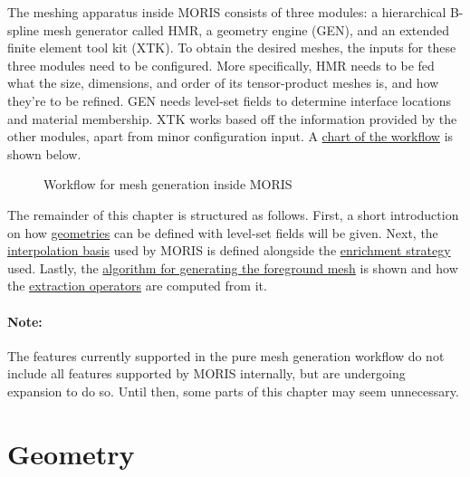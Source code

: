 The meshing apparatus inside MORIS consists of three modules: a hierarchical B-spline mesh generator called HMR, a geometry engine (GEN), and an extended finite element tool kit (XTK). To obtain the desired meshes, the inputs for these three modules need to be configured. More specifically, HMR needs to be fed what the size, dimensions, and order of its tensor-product meshes is, and how they're to be refined. GEN needs level-set fields to determine interface locations and material membership. XTK works based off the information provided by the other modules, apart from minor configuration input. A \hyperref[fig:workflow]{chart of the workflow} is shown below.

\vspace*{0.5cm}

\begin{figure}[h]
    \vspace{0.5cm}
    \begin{center}
    
    \caption{Workflow for mesh generation inside MORIS} 
    \label{fig:workflow}
    \end{center}
\end{figure}

The remainder of this chapter is structured as follows. First, a short introduction on how \hyperref[sec:overview_geometry]{geometries} can be defined with level-set fields will be given. Next, the \hyperref[sec:overview_background]{interpolation basis} used by MORIS is defined alongside the \hyperlink{enrichment}{enrichment strategy} used. Lastly, the \hyperlink{decomposition}{algorithm for generating the foreground mesh} is shown and how the \hyperref[sec:overview_extraction]{extraction operators} are computed from it.

\paragraph{Note:} The features currently supported in the pure mesh generation workflow do not include all features supported by MORIS internally, but are undergoing expansion to do so. Until then, some parts of this chapter may seem unnecessary. 


\section{Geometry}
\label{sec:overview_geometry}


